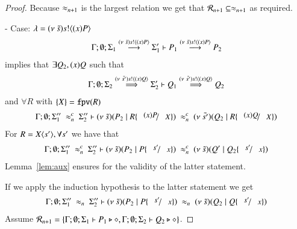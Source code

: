 \begin{proof}
	\noi Because $\approx_{n+1}$ is the largest relation we get that $\mathcal{R}_{n+1} \subseteq \approx_{n+1}$ as required.


	\noi - Case: $\lambda = (\nu\ \tilde{s}) s ! \langle (x)P \rangle$
%
	\begin{eqnarray}
		\Gamma; \emptyset; \Sigma_1 \stackrel{(\nu\ \tilde{s}) s ! \langle (x)P \rangle}{\longrightarrow} \Sigma_1' \vdash P_1 \stackrel{(\nu\ \tilde{s}) s ! \langle (x)P \rangle}{\longrightarrow} P_2 \label{lem:wbc_is_wb4}
	\end{eqnarray}
%
	\noi implies that
	$\exists Q_2, (x)Q$ such that
	\begin{eqnarray}
		\Gamma; \emptyset; \Sigma_2 \stackrel{(\nu\ \tilde{s'}) s ! \langle (x)Q \rangle}{\Longrightarrow} \Sigma_2' \vdash Q_1 \stackrel{(\nu\ \tilde{s'}) s ! \langle (x)Q \rangle}{\Longrightarrow} Q_2  \label{lem:wbc_is_wb5}
	\end{eqnarray}
	and $\forall R$ with $\{X\} = \mathtt{fpv}(R)$
%
	\begin{eqnarray*}
		\Gamma; \emptyset; \Sigma_1''\ \wbc_{n}\ \Sigma_2'' \proves \newsp{\tilde{s}}{P_2 \Par R \subst{(x) P}{X}}\ \wbc_{n}\ 
		\newsp{\tilde{s'}}{Q_2 \Par R\subst{(x) Q}{X}}
	\end{eqnarray*}
%
	\noi For $R = X\langle s' \rangle, \forall s'$ we have that 
%
	\begin{eqnarray*}
		\Gamma; \emptyset; \Sigma_1''\ \wbc_{n}\ \Sigma_2'' \proves \newsp{\tilde{s}}{P_2 \Par P \subst{s'}{x}}\ \wbc_{n}\ 
		\newsp{\tilde{s}}{Q' \Par Q_2 \subst{s'}{x}}
	\end{eqnarray*}
%
	\noi Lemma~\ref{lem:aux} ensures for the validity of the latter statement.

	\noi If we apply the induction hypothesis to the latter statement we get
%
	\begin{eqnarray}
		\Gamma; \emptyset; \Sigma_1''\ \wb_{n}\ \Sigma_2'' \proves \newsp{\tilde{s}}{P_2 \Par P \subst{s'}{x}}\ \wb_{n}\ 
		\newsp{\tilde{s}}{Q_2 \Par Q \subst{s'}{x}}
		\label{lem:wbc_is_wb6}
	\end{eqnarray}
%
	\noi Assume $\mathcal{R}_{n+1} = \{\Gamma; \emptyset; \Sigma_1 \vdash P_1 \triangleright \diamond, \Gamma; \emptyset; \Sigma_2 \vdash Q_2 \triangleright \diamond\}$.


\end{proof}
